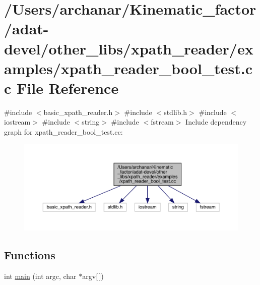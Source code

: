 \hypertarget{adat-devel_2other__libs_2xpath__reader_2examples_2xpath__reader__bool__test_8cc}{}\section{/\+Users/archanar/\+Kinematic\+\_\+factor/adat-\/devel/other\+\_\+libs/xpath\+\_\+reader/examples/xpath\+\_\+reader\+\_\+bool\+\_\+test.cc File Reference}
\label{adat-devel_2other__libs_2xpath__reader_2examples_2xpath__reader__bool__test_8cc}
{\ttfamily \#include $<$basic\+\_\+xpath\+\_\+reader.\+h$>$}\newline
{\ttfamily \#include $<$stdlib.\+h$>$}\newline
{\ttfamily \#include $<$iostream$>$}\newline
{\ttfamily \#include $<$string$>$}\newline
{\ttfamily \#include $<$fstream$>$}\newline
Include dependency graph for xpath\+\_\+reader\+\_\+bool\+\_\+test.\+cc\+:
\nopagebreak
\begin{figure}[H]
\begin{center}
\leavevmode
\includegraphics[width=350pt]{d0/d24/adat-devel_2other__libs_2xpath__reader_2examples_2xpath__reader__bool__test_8cc__incl}
\end{center}
\end{figure}
\subsection*{Functions}
\begin{DoxyCompactItemize}
\item 
int \mbox{\hyperlink{adat-devel_2other__libs_2xpath__reader_2examples_2xpath__reader__bool__test_8cc_a0ddf1224851353fc92bfbff6f499fa97}{main}} (int argc, char $\ast$argv\mbox{[}$\,$\mbox{]})
\end{DoxyCompactItemize}


